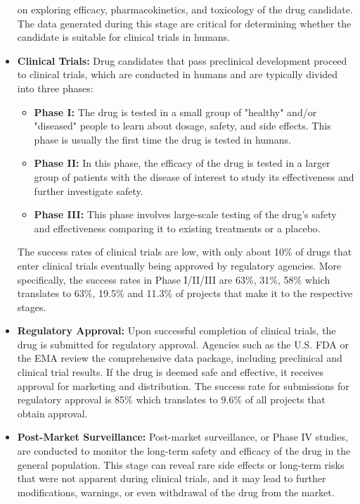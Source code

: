 \begin{itemize}
            on exploring efficacy, pharmacokinetics, and toxicology of the drug candidate. The data
            generated during this stage are critical for determining whether the candidate is
            suitable for clinical trials in humans.
      \item \textbf{Clinical Trials:} Drug candidates that pass preclinical development proceed to
            clinical trials, which are conducted in humans and are typically divided into three phases:
            \begin{itemize}
                  \item \textbf{Phase I:} The drug is tested in a small group of "healthy" and/or "diseased" people to learn about
                        dosage, safety, and side effects. This phase is usually the first time the drug is tested in humans.
                  \item \textbf{Phase II:} In this phase, the efficacy of the drug is tested in a larger
                        group of patients with the disease of interest to study its effectiveness and further investigate safety.
                  \item \textbf{Phase III:} This phase involves large-scale testing of the drug's safety
                        and effectiveness comparing it to existing treatments or a placebo.
            \end{itemize}
            The success rates of clinical trials are low, with only about 10\% of drugs that enter clinical
            trials eventually being approved by regulatory agencies. More specifically, the success rates in
            Phase I/II/III are 63\%, 31\%, 58\% which translates to 63\%, 19.5\% and 11.3\% of projects that
            make it to the respective stages.
      \item \textbf{Regulatory Approval:} Upon successful completion of clinical trials, the drug is
            submitted for regulatory approval. Agencies such as the U.S. \Ac{FDA} or the \Ac{EMA}
            review the comprehensive data package, including preclinical and clinical trial results.
            If the drug is deemed safe and effective, it receives approval for marketing and
            distribution. The success rate for submissions for regulatory approval is 85\%
            \citep{mullardParsingClinicalSuccess2016} which translates to 9.6\% of all projects that
            obtain approval.
      \item \textbf{Post-Market Surveillance:} Post-market surveillance, or Phase IV studies, are
            conducted to monitor the long-term safety and efficacy of the drug in the general population.
            This stage can reveal rare side effects or long-term risks that were not apparent during
            clinical trials, and it may lead to further modifications, warnings, or even withdrawal of the
            drug from the market.
\end{itemize}

